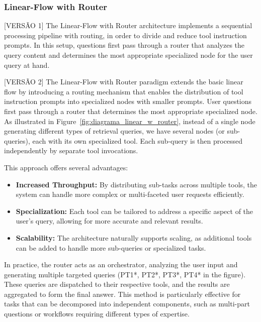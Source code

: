             \subsubsection{Linear-Flow with Router}

                [VERSÃO 1]
                The Linear-Flow with Router architecture implements a sequential processing pipeline with routing, in order to divide and reduce tool instruction prompts. In this setup, questions first pass through a router that analyzes the query content and determines the most appropriate specialized node for the user query at hand. 
                
                [VERSÃO 2]
                The Linear-Flow with Router paradigm extends the basic linear flow by introducing a routing mechanism that enables the distribution of tool instruction prompts into specialized nodes with smaller prompts. User questions first pass through a router that determines the most appropriate specialized node. As illustrated in Figure~\ref{fig:diagrama_linear_w_router}, instead of a single node generating different types of retrieval queries, we have several nodes (or sub-queries), each with its own specialized tool. Each sub-query is then processed independently by separate tool invocations.
                    
                This approach offers several advantages:

                \begin{itemize}

                    \item \textbf{Increased Throughput:} By distributing sub-tasks across multiple tools, the system can handle more complex or multi-faceted user requests efficiently.
                    
                    \item \textbf{Specialization:} Each tool can be tailored to address a specific aspect of the user's query, allowing for more accurate and relevant results.
                    
                    \item \textbf{Scalability:} The architecture naturally supports scaling, as additional tools can be added to handle more sub-queries or specialized tasks.
                    
                \end{itemize}
                
                In practice, the router acts as an orchestrator, analyzing the user input and generating multiple targeted queries (PT1*, PT2*, PT3*, PT4* in the figure). These queries are dispatched to their respective tools, and the results are aggregated to form the final answer. This method is particularly effective for tasks that can be decomposed into independent components, such as multi-part questions or workflows requiring different types of expertise.
                
